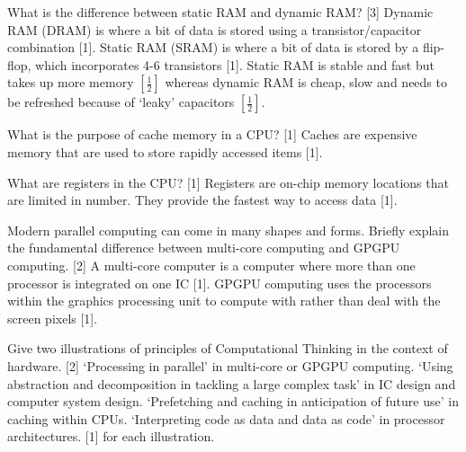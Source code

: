 \documentclass[grid,avery5371]{flashcards}
\begin{document}
\begin{flashcard}[]{What is the difference between static RAM and dynamic RAM? [3]}
Dynamic RAM (DRAM) is where a bit of data is stored using a transistor/capacitor
combination [1]. Static RAM (SRAM) is where a bit
of data is stored by a flip-flop, which incorporates 4-6 transistors [1].
Static RAM is stable and fast but takes up more memory $[\frac{1}{2}]$ whereas
dynamic RAM is cheap, slow and needs to be refreshed because of
‘leaky’ capacitors $[\frac{1}{2}]$.
\end{flashcard}

\begin{flashcard}[]{What is the purpose of cache memory in a CPU? [1]}
Caches are expensive memory that are used to store rapidly accessed
items [1].
\end{flashcard}

\begin{flashcard}[]{What are registers in the CPU? [1]}
Registers are on-chip memory locations that are limited in number.
They provide the fastest way to access data [1].
\end{flashcard}

\begin{flashcard}[]{Modern parallel computing can come in many shapes and forms. Briefly explain the fundamental difference between multi-core computing and
GPGPU computing. [2]}
A multi-core computer is a computer where more than one processor
is integrated on one IC [1]. GPGPU computing uses the processors
within the graphics processing unit to compute with rather than deal
with the screen pixels [1].
\end{flashcard}

\begin{flashcard}[]{Give two illustrations of principles of Computational Thinking in the context of hardware. [2]}
‘Processing in parallel’ in multi-core or GPGPU computing. ‘Using
abstraction and decomposition in tackling a large complex task’ in IC
design and computer system design. ‘Prefetching and caching in anticipation
of future use’ in caching within CPUs. ‘Interpreting code as data
and data as code’ in processor architectures. [1] for each illustration.
\end{flashcard}
\end{document}
